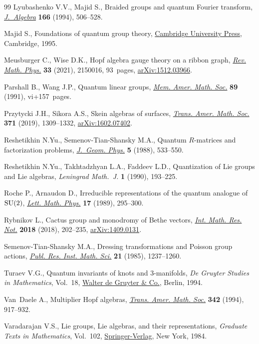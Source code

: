 \documentclass[pdftex]{sigma}%
\numberwithin{equation}{section}
\numberwithin{figure}{section}
\begin{document}
\begin{thebibliography}{99}
Lyubashenko V.V., Majid S., Braided groups and quantum {F}ourier transform,
 \href{https://doi.org/10.1006/jabr.1994.1165}{\textit{J.~Algebra}} \textbf{166} (1994), 506--528.

Majid S., Foundations of quantum group theory, \href{https://doi.org/10.1017/CBO9780511613104}{Cambridge University Press},
 Cambridge, 1995.

Meusburger C., Wise D.K., Hopf algebra gauge theory on a ribbon graph,
 \href{https://doi.org/10.1142/S0129055X21500161}{\textit{Rev. Math. Phys.}} \textbf{33} (2021), 2150016, 93~pages,
 \href{https://arxiv.org/abs/1512.03966}{arXiv:1512.03966}.

Parshall B., Wang J.P., Quantum linear groups, \href{https://doi.org/10.1090/memo/0439}{\textit{Mem. Amer. Math. Soc.}}
 \textbf{89} (1991), vi+157~pages.

Przytycki J.H., Sikora A.S., Skein algebras of surfaces, \href{https://doi.org/10.1090/tran/7298}{\textit{Trans. Amer.
 Math. Soc.}} \textbf{371} (2019), 1309--1332, \href{https://arxiv.org/abs/1602.07402}{arXiv:1602.07402}.

Reshetikhin N.Yu., Semenov-Tian-Shansky M.A., Quantum {$R$}-matrices and
 factorization problems, \href{https://doi.org/10.1016/0393-0440(88)90018-6}{\textit{J.~Geom. Phys.}} \textbf{5} (1988), 533--550.

Reshetikhin N.Yu., Takhtadzhyan L.A., Faddeev L.D., Quantization of {L}ie groups
 and {L}ie algebras, \textit{Leningrad Math.~J.} \textbf{1} (1990), 193--225.

Roche P., Arnaudon D., Irreducible representations of the quantum analogue of
 {${\rm SU}(2)$}, \href{https://doi.org/10.1007/BF00399753}{\textit{Lett. Math. Phys.}} \textbf{17} (1989), 295--300.

Rybnikov L., Cactus group and monodromy of {B}ethe vectors, \href{https://doi.org/10.1093/imrn/rnw259}{\textit{Int. Math.
 Res. Not.}} \textbf{2018} (2018), 202--235, \href{https://arxiv.org/abs/1409.0131}{arXiv:1409.0131}.

Semenov-Tian-Shansky M.A., Dressing transformations and {P}oisson group
 actions, \href{https://doi.org/10.2977/prims/1195178514}{\textit{Publ. Res. Inst. Math. Sci.}} \textbf{21} (1985), 1237--1260.

Turaev V.G., Quantum invariants of knots and 3-manifolds, \textit{De Gruyter
 Studies in Mathematics}, Vol.~18, \href{https://doi.org/10.1515/9783110435221}{Walter de Gruyter \& Co.}, Berlin, 1994.

Van~Daele A., Multiplier {H}opf algebras, \href{https://doi.org/10.2307/2154659}{\textit{Trans. Amer. Math. Soc.}}
 \textbf{342} (1994), 917--932.

Varadarajan V.S., Lie groups, {L}ie algebras, and their representations,
 \textit{Graduate Texts in Mathematics}, Vol.~102, \href{https://doi.org/10.1007/978-1-4612-1126-6}{Springer-Verlag}, New York,
 1984.

\end{thebibliography}\LastPageEnding
\end{document}
